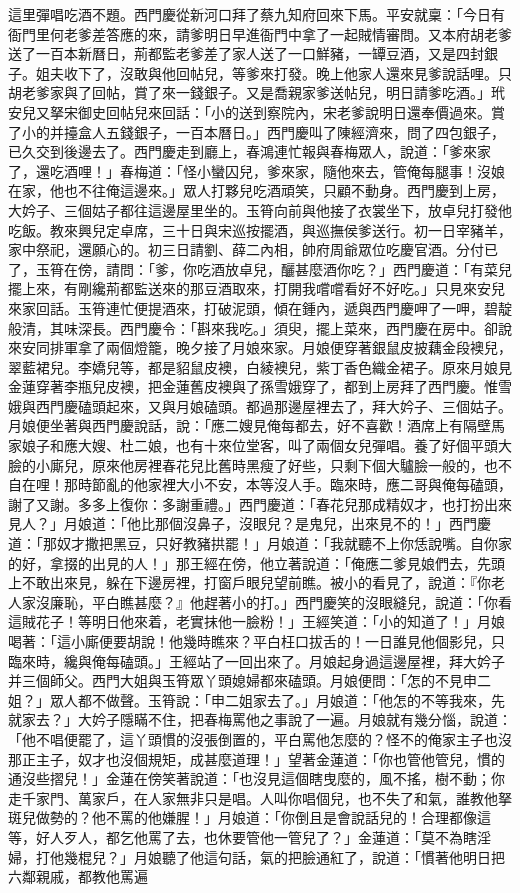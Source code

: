 \begin{showcontents}{}
這里彈唱吃酒不題。西門慶從新河口拜了蔡九知府回來下馬。平安就稟：「今日有衙門里何老爹差答應的來，請爹明日早進衙門中拿了一起賊情審問。又本府胡老爹送了一百本新曆日，荊都監老爹差了家人送了一口鮮豬，一罈豆酒，又是四封銀子。姐夫收下了，沒敢與他回帖兒，等爹來打發。晚上他家人還來見爹說話哩。只胡老爹家與了回帖，賞了來一錢銀子。又是喬親家爹送帖兒，明日請爹吃酒。」玳安兒又拏宋御史回帖兒來回話：「小的送到察院內，宋老爹說明日還奉價過來。賞了小的并擡盒人五錢銀子，一百本曆日。」西門慶叫了陳經濟來，問了四包銀子，已久交到後邊去了。西門慶走到廳上，春鴻連忙報與春梅眾人，說道：「爹來家了，還吃酒哩！」春梅道：「怪小蠻囚兒，爹來家，隨他來去，管俺每腿事！沒娘在家，他也不往俺這邊來。」眾人打夥兒吃酒頑笑，只顧不動身。西門慶到上房，大妗子、三個姑子都往這邊屋里坐的。玉筲向前與他接了衣裳坐下，放卓兒打發他吃飯。教來興兒定卓席，三十日與宋巡按擺酒，與巡撫侯爹送行。初一日宰豬羊，家中祭祀，還願心的。初三日請劉、薛二內相，帥府周爺眾位吃慶官酒。分付已了，玉筲在傍，請問：「爹，你吃酒放卓兒，釃甚麼酒你吃？」西門慶道：「有菜兒擺上來，有剛纔荊都監送來的那豆酒取來，打開我嚐嚐看好不好吃。」只見來安兒來家回話。玉筲連忙便提酒來，打破泥頭，傾在鍾內，遞與西門慶呷了一呷，碧靛般清，其味深長。西門慶令：「斟來我吃。」須臾，擺上菜來，西門慶在房中。卻說來安同排軍拿了兩個燈籠，晚夕接了月娘來家。月娘便穿著銀鼠皮披藕金段襖兒，翠藍裙兒。李嬌兒等，都是貂鼠皮襖，白綾襖兒，紫丁香色織金裙子。原來月娘見金蓮穿著李瓶兒皮襖，把金蓮舊皮襖與了孫雪娥穿了，都到上房拜了西門慶。惟雪娥與西門慶磕頭起來，又與月娘磕頭。都過那邊屋裡去了，拜大妗子、三個姑子。月娘便坐著與西門慶說話，說：「應二嫂見俺每都去，好不喜歡！酒席上有隔壁馬家娘子和應大嫂、杜二娘，也有十來位堂客，叫了兩個女兒彈唱。養了好個平頭大臉的小廝兒，原來他房裡春花兒比舊時黑瘦了好些，只剩下個大驢臉一般的，也不自在哩！那時節亂的他家裡大小不安，本等沒人手。臨來時，應二哥與俺每磕頭，謝了又謝。多多上復你：多謝重禮。」西門慶道：「春花兒那成精奴才，也打扮出來見人？」月娘道：「他比那個沒鼻子，沒眼兒？是鬼兒，出來見不的！」西門慶道：「那奴才撒把黑豆，只好教豬拱罷！」月娘道：「我就聽不上你恁說嘴。自你家的好，拿掇的出見的人！」那王經在傍，他立著說道：「俺應二爹見娘們去，先頭上不敢出來見，躲在下邊房裡，打窗戶眼兒望前瞧。被小的看見了，說道：『你老人家沒廉恥，平白瞧甚麼？』他趕著小的打。」西門慶笑的沒眼縫兒，說道：「你看這賊花子！等明日他來着，老實抹他一臉粉！」王經笑道：「小的知道了！」月娘喝著：「這小廝便要胡說！他幾時瞧來？平白枉口拔舌的！一日誰見他個影兒，只臨來時，纔與俺每磕頭。」王經站了一回出來了。月娘起身過這邊屋裡，拜大妗子并三個師父。西門大姐與玉筲眾丫頭媳婦都來磕頭。月娘便問：「怎的不見申二姐？」眾人都不做聲。玉筲說：「申二姐家去了。」月娘道：「他怎的不等我來，先就家去？」大妗子隱瞞不住，把春梅罵他之事說了一遍。月娘就有幾分惱，說道：「他不唱便罷了，這丫頭慣的沒張倒置的，平白罵他怎麼的？怪不的俺家主子也沒那正主子，奴才也沒個規矩，成甚麼道理！」望著金蓮道：「你也管他管兒，慣的通沒些摺兒！」金蓮在傍笑著說道：「也沒見這個瞎曳麼的，風不搖，樹不動；你走千家門、萬家戶，在人家無非只是唱。人叫你唱個兒，也不失了和氣，誰教他拏斑兒做勢的？他不罵的他嫌腥！」月娘道：「你倒且是會說話兒的！合理都像這等，好人歹人，都乞他罵了去，也休要管他一管兒了？」金蓮道：「莫不為瞎淫婦，打他幾棍兒？」月娘聽了他這句話，氣的把臉通紅了，說道：「慣著他明日把六鄰親戚，都教他罵遍
\end{showcontents}
